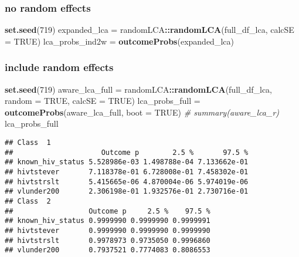 \documentclass[
]{article}
\newenvironment{Shaded}{\begin{snugshade}}{\end{snugshade}}
\newcommand{\CommentTok}[1]{\textcolor[rgb]{0.56,0.35,0.01}{\textit{#1}}}
\newcommand{\DataTypeTok}[1]{\textcolor[rgb]{0.13,0.29,0.53}{#1}}
\newcommand{\DecValTok}[1]{\textcolor[rgb]{0.00,0.00,0.81}{#1}}
\newcommand{\KeywordTok}[1]{\textcolor[rgb]{0.13,0.29,0.53}{\textbf{#1}}}
\newcommand{\NormalTok}[1]{#1}
\newcommand{\OperatorTok}[1]{\textcolor[rgb]{0.81,0.36,0.00}{\textbf{#1}}}
\newcommand{\OtherTok}[1]{\textcolor[rgb]{0.56,0.35,0.01}{#1}}
\newcommand{\StringTok}[1]{\textcolor[rgb]{0.31,0.60,0.02}{#1}}
\begin{document}
\hypertarget{no-random-effects}{%
\subsubsection{no random effects}\label{no-random-effects}}

\begin{Shaded}
\begin{Highlighting}[]
\KeywordTok{set.seed}\NormalTok{(}\DecValTok{719}\NormalTok{)}
\NormalTok{expanded_lca =}\StringTok{ }\NormalTok{randomLCA}\OperatorTok{::}\KeywordTok{randomLCA}\NormalTok{(full_df_lca, }\DataTypeTok{calcSE =} \OtherTok{TRUE}\NormalTok{)}
\NormalTok{lca_probs_ind2w =}\StringTok{ }\KeywordTok{outcomeProbs}\NormalTok{(expanded_lca)}
\end{Highlighting}
\end{Shaded}

\hypertarget{include-random-effects}{%
\subsubsection{include random effects}\label{include-random-effects}}

\begin{Shaded}
\begin{Highlighting}[]
\KeywordTok{set.seed}\NormalTok{(}\DecValTok{719}\NormalTok{)}
\NormalTok{aware_lca_full =}\StringTok{ }\NormalTok{randomLCA}\OperatorTok{::}\KeywordTok{randomLCA}\NormalTok{(full_df_lca, }\DataTypeTok{random =} \OtherTok{TRUE}\NormalTok{, }\DataTypeTok{calcSE =} \OtherTok{TRUE}\NormalTok{)}
\NormalTok{lca_probs_full =}\StringTok{ }\KeywordTok{outcomeProbs}\NormalTok{(aware_lca_full, }\DataTypeTok{boot =} \OtherTok{TRUE}\NormalTok{)}
\CommentTok{# summary(aware_lca_r)}
\NormalTok{lca_probs_full}
\end{Highlighting}
\end{Shaded}

\begin{verbatim}
## Class  1 
##                     Outcome p        2.5 %       97.5 %
## known_hiv_status 5.528986e-03 1.498788e-04 7.133662e-01
## hivtstever       7.118378e-01 6.728008e-01 7.458302e-01
## hivtstrslt       5.415665e-06 4.870004e-06 5.974019e-06
## vlunder200       2.306198e-01 1.932576e-01 2.730716e-01
## Class  2 
##                  Outcome p     2.5 %    97.5 %
## known_hiv_status 0.9999990 0.9999990 0.9999991
## hivtstever       0.9999990 0.9999990 0.9999990
## hivtstrslt       0.9978973 0.9735050 0.9996860
## vlunder200       0.7937521 0.7774083 0.8086553
\end{verbatim}
\end{document}
